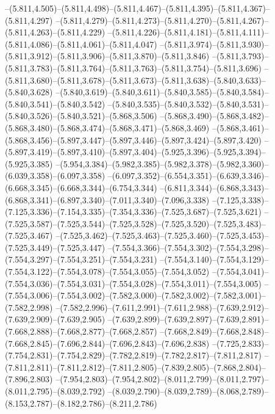  --(5.811,4.505)--(5.811,4.498)--(5.811,4.467)--(5.811,4.395)--(5.811,4.367)--(5.811,4.297)%
  --(5.811,4.279)--(5.811,4.273)--(5.811,4.270)--(5.811,4.267)--(5.811,4.263)--(5.811,4.229)%
  --(5.811,4.226)--(5.811,4.181)--(5.811,4.111)--(5.811,4.086)--(5.811,4.061)--(5.811,4.047)%
  --(5.811,3.974)--(5.811,3.930)--(5.811,3.912)--(5.811,3.906)--(5.811,3.870)--(5.811,3.846)%
  --(5.811,3.793)--(5.811,3.783)--(5.811,3.764)--(5.811,3.763)--(5.811,3.754)--(5.811,3.696)%
  --(5.811,3.680)--(5.811,3.678)--(5.811,3.673)--(5.811,3.638)--(5.840,3.633)--(5.840,3.628)%
  --(5.840,3.619)--(5.840,3.611)--(5.840,3.585)--(5.840,3.584)--(5.840,3.541)--(5.840,3.542)%
  --(5.840,3.535)--(5.840,3.532)--(5.840,3.531)--(5.840,3.526)--(5.840,3.521)--(5.868,3.506)%
  --(5.868,3.490)--(5.868,3.482)--(5.868,3.480)--(5.868,3.474)--(5.868,3.471)--(5.868,3.469)%
  --(5.868,3.461)--(5.868,3.456)--(5.897,3.447)--(5.897,3.446)--(5.897,3.424)--(5.897,3.420)%
  --(5.897,3.419)--(5.897,3.410)--(5.897,3.404)--(5.925,3.396)--(5.925,3.394)--(5.925,3.385)%
  --(5.954,3.384)--(5.982,3.385)--(5.982,3.378)--(5.982,3.360)--(6.039,3.358)--(6.097,3.358)%
  --(6.097,3.352)--(6.554,3.351)--(6.639,3.346)--(6.668,3.345)--(6.668,3.344)--(6.754,3.344)%
  --(6.811,3.344)--(6.868,3.343)--(6.868,3.341)--(6.897,3.340)--(7.011,3.340)--(7.096,3.338)%
  --(7.125,3.338)--(7.125,3.336)--(7.154,3.335)--(7.354,3.336)--(7.525,3.687)--(7.525,3.621)%
  --(7.525,3.587)--(7.525,3.544)--(7.525,3.528)--(7.525,3.520)--(7.525,3.483)--(7.525,3.467)%
  --(7.525,3.462)--(7.525,3.463)--(7.525,3.460)--(7.525,3.453)--(7.525,3.449)--(7.525,3.447)%
  --(7.554,3.366)--(7.554,3.302)--(7.554,3.298)--(7.554,3.297)--(7.554,3.251)--(7.554,3.231)%
  --(7.554,3.140)--(7.554,3.129)--(7.554,3.122)--(7.554,3.078)--(7.554,3.055)--(7.554,3.052)%
  --(7.554,3.041)--(7.554,3.036)--(7.554,3.031)--(7.554,3.028)--(7.554,3.011)--(7.554,3.005)%
  --(7.554,3.006)--(7.554,3.002)--(7.582,3.000)--(7.582,3.002)--(7.582,3.001)--(7.582,2.998)%
  --(7.582,2.996)--(7.611,2.991)--(7.611,2.988)--(7.639,2.912)--(7.639,2.909)--(7.639,2.905)%
  --(7.639,2.899)--(7.639,2.897)--(7.639,2.891)--(7.668,2.888)--(7.668,2.877)--(7.668,2.857)%
  --(7.668,2.849)--(7.668,2.848)--(7.668,2.845)--(7.696,2.844)--(7.696,2.843)--(7.696,2.838)%
  --(7.725,2.833)--(7.754,2.831)--(7.754,2.829)--(7.782,2.819)--(7.782,2.817)--(7.811,2.817)%
  --(7.811,2.811)--(7.811,2.812)--(7.811,2.805)--(7.839,2.805)--(7.868,2.804)--(7.896,2.803)%
  --(7.954,2.803)--(7.954,2.802)--(8.011,2.799)--(8.011,2.797)--(8.011,2.795)--(8.039,2.792)%
  --(8.039,2.790)--(8.039,2.789)--(8.068,2.789)--(8.153,2.787)--(8.182,2.786)--(8.211,2.786)%
